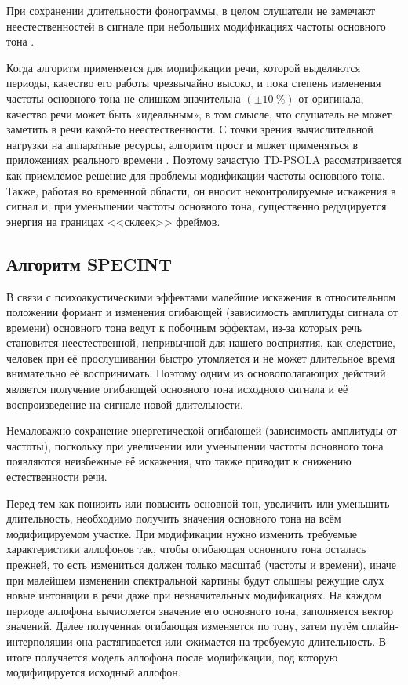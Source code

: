 При сохранении длительности фонограммы, в целом слушатели не замечают неестественностей в сигнале при небольших модификациях частоты основного тона \cite{taylor_2009}.

Когда алгоритм применяется для модификации речи, которой выделяются периоды, качество его работы чрезвычайно высоко, и пока степень изменения частоты основного тона не слишком значительна $(\pm10~\%)$ от оригинала, качество речи может быть «идеальным», в том смысле, что слушатель не может заметить в речи какой-то неестественности. С точки зрения вычислительной нагрузки на аппаратные ресурсы, алгоритм прост и может применяться в приложениях реального времени \cite{td_comp}. Поэтому зачастую TD-PSOLA рассматривается как приемлемое решение для проблемы модификации частоты основного тона. Также, работая во временной области, он вносит неконтролируемые искажения в сигнал и, при уменьшении частоты основного тона, существенно редуцируется энергия на границах <<склеек>> фреймов.

\subsection{Алгоритм SPECINT}

В связи с психоакустическими эффектами малейшие искажения в относительном положении формант и изменения огибающей (зависимость амплитуды сигнала от времени) основного тона ведут к побочным эффектам, из-за которых речь становится неестественной, непривычной для нашего восприятия, как следствие, человек при её прослушивании быстро утомляется и не может длительное время внимательно её воспринимать. Поэтому одним из основополагающих действий является получение огибающей основного тона исходного сигнала и её воспроизведение на сигнале новой длительности.

Немаловажно сохранение энергетической огибающей (зависимость амплитуды от частоты), поскольку при увеличении или уменьшении частоты основного тона появляются неизбежные её искажения, что также приводит к снижению естественности речи.

Перед тем как понизить или повысить основной тон, увеличить или уменьшить длительность, необходимо получить значения основного тона на всём модифицируемом участке. При модификации нужно изменить требуемые характеристики аллофонов так, чтобы огибающая основного тона осталась прежней, то есть измениться должен только масштаб (частоты и времени), иначе при малейшем изменении спектральной картины будут слышны режущие слух новые интонации в речи даже при незначительных модификациях. На каждом периоде аллофона вычисляется значение его основного тона, заполняется вектор значений. Далее полученная огибающая изменяется по тону, затем путём сплайн-интерполяции она растягивается или сжимается на требуемую длительность. В итоге получается модель аллофона после модификации, под которую модифицируется исходный аллофон.

